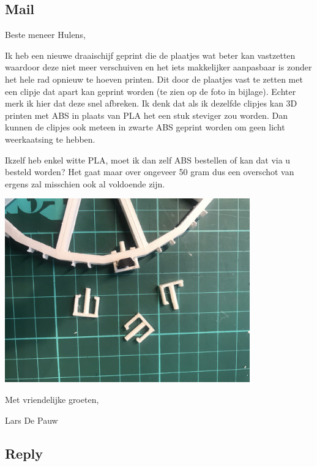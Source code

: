 \documentclass{article}
\begin{document}
\subsection{Mail}

Beste meneer Hulens,

 

Ik heb een nieuwe draaischijf geprint die de plaatjes wat beter kan vastzetten waardoor deze niet meer verschuiven en het iets makkelijker aanpasbaar is zonder het hele rad opnieuw te hoeven printen. Dit door de plaatjes vast te zetten met een clipje dat apart kan geprint worden (te zien op de foto in bijlage). Echter merk ik hier dat deze snel afbreken. Ik denk dat als ik dezelfde clipjes kan 3D printen met ABS in plaats van PLA het een stuk steviger zou worden. Dan kunnen de clipjes ook meteen in zwarte ABS geprint worden om geen licht weerkaatsing te hebben.

Ikzelf heb enkel witte PLA, moet ik dan zelf ABS bestellen of kan dat via u besteld worden? Het gaat maar over ongeveer 50 gram dus een overschot van ergens zal misschien ook al voldoende zijn.

 

\includegraphics[width=4.166667in, keepaspectratio=true]{./ZimFiles_files/Verslagen/Activiteiten_rapport/Activities/Masterproef_Tool_Wear_Inspection_-_Update_4_DH/voorbeelden van clips op 1cm mat.jpeg}

 

Met vriendelijke groeten,

 

Lars De Pauw



\subsection{Reply}
\end{document}
